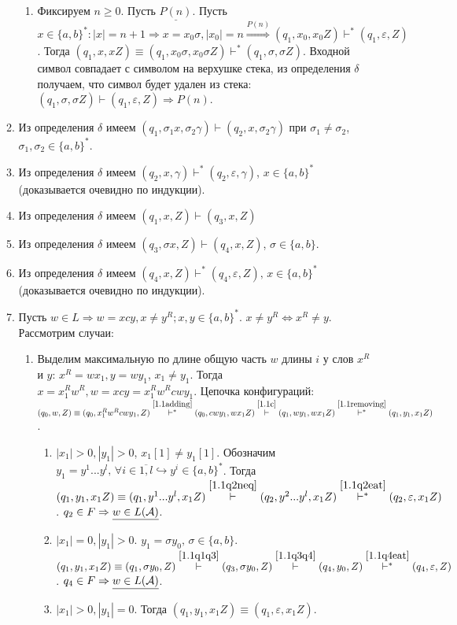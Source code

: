 \documentclass[a4paper]{article}
\def\A{{\cal A}}
\begin{document}
\begin{enumerate}[1.]
\begin{enumerate}[1.]
\begin{enumerate}
\item Фиксируем $n\geqslant 0$. Пусть $\underline{P(n)}$. Пусть $x\in\{a,b\}^*\colon |x|=n+1\Rightarrow x=x_0\sigma,|x_0|=n\overset{P(n)}{\Rightarrow} (q_1,x_0,x_0Z)\vdash^*(q_1,\varepsilon,Z)$. Тогда $(q_1,x,xZ)\equiv(q_1,x_0\sigma,x_0\sigma Z)\vdash^*(q_1,\sigma,\sigma Z)$. Входной символ совпадает с символом на верхушке стека, из определения $\delta$ получаем, что символ будет удален из стека: $(q_1,\sigma,\sigma Z)\vdash(q_1,\varepsilon,Z)\Rightarrow P(n)$.
\end{enumerate}
\item \label{1.1q2neq} Из определения $\delta$ имеем $(q_1,\sigma_1x,\sigma_2\gamma)\vdash(q_2,x,\sigma_2\gamma)$ при $\sigma_1\neq\sigma_2$, $\sigma_1,\sigma_2\in\{a,b\}^*$.
\item \label{1.1q2eat} Из определения $\delta$ имеем $(q_2,x,\gamma)\vdash^*(q_2,\varepsilon,\gamma)$, $x\in\{a,b\}^*$ (доказывается очевидно по индукции).
\item \label{1.1q1q3} Из определения $\delta$ имеем $(q_1,x,Z)\vdash(q_3,x,Z)$
\item \label{1.1q3q4} Из определения $\delta$ имеем $(q_3,\sigma x,Z)\vdash(q_4,x,Z)$, $\sigma\in \{a,b\}$.
\item \label{1.1q4eat} Из определения $\delta$ имеем $(q_4,x,Z)\vdash^*(q_4,\varepsilon,Z),\,x\in\{a,b\}^*$ (доказывается очевидно по индукции).
\item Пусть $w\in L\Rightarrow w=xcy,x\neq y^R;x,y\in\{a,b\}^*$. $x\neq y^R\Leftrightarrow x^R\neq y$. Рассмотрим случаи:
\begin{enumerate}
\item Выделим максимальную по длине общую часть $w$ длины $i$ у слов $x^R$ и $y$: $x^R=wx_1,y=wy_1$, $x_1\neq y_1$. Тогда $x=x_1^Rw^R, w=xcy=x_1^Rw^Rcwy_1$. Цепочка конфигураций:\newline $(q_0,w,Z)\equiv(q_0,x_1^Rw^Rcwy_1,Z)\overset{\ref{1.1adding}}{\vdash^*}(q_0,cwy_1,wx_1Z)\overset{\ref{1.1c}}{\vdash}(q_1,wy_1,wx_1Z)\overset{\ref{1.1removing}}{\vdash^*}(q_1,y_1,x_1Z)$.
\begin{enumerate}
\item $|x_1|>0,|y_1|>0$, $x_1[1]\neq y_1[1]$. Обозначим $y_1=y^1...y^l,\,\forall i\in\overline{1,l}\hookrightarrow y^i\in \{a,b\}^*$. Тогда $(q_1,y_1,x_1Z)\equiv(q_1,y^1...y^l,x_1Z)\overset{\ref{1.1q2neq}}{\vdash}(q_2,y^2...y^l,x_1Z)\overset{\ref{1.1q2eat}}{\vdash^*}(q_2,\varepsilon,x_1Z)$. $q_2\in F\Rightarrow \underline{w\in L(\A)}$.
\item $|x_1|=0,|y_1|>0$. $y_1=\sigma y_0,\,\sigma\in\{a,b\}$. $(q_1,y_1,x_1Z)\equiv(q_1,\sigma y_0,Z)\overset{\ref{1.1q1q3}}{\vdash}(q_3,\sigma y_0,Z)\overset{\ref{1.1q3q4}}{\vdash}(q_4,y_0,Z)\overset{\ref{1.1q4eat}}{\vdash^*}(q_4,\varepsilon,Z)$. $q_4\in F\Rightarrow \underline{w\in L(\A)}$.
\item $|x_1|>0,|y_1|=0$. Тогда $(q_1,y_1,x_1Z)\equiv(q_1,\varepsilon,x_1Z)$.
\end{enumerate}
\end{enumerate}
\end{enumerate}
\end{enumerate}
\end{document}
